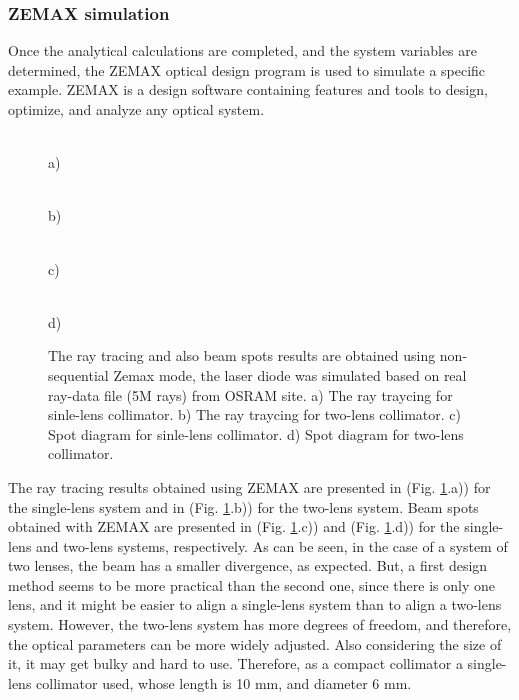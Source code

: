 \subsubsection{ZEMAX simulation}

Once the analytical calculations are completed, and the system variables are determined, the ZEMAX optical design program is used to simulate a specific example.
ZEMAX is a design software containing features and tools to design, optimize, and analyze any optical system.



\begin{figure}[H]
\begin{minipage}[h]{0.48\linewidth}
\\ a)
\end{minipage}
\hfill
\begin{minipage}[h]{0.45\linewidth}
\\ b)
\end{minipage}
\vfill
\begin{minipage}[h]{0.495\linewidth}
 \\ c)
\end{minipage}
\hfill
\begin{minipage}[h]{0.495\linewidth}
 \\ d)
\end{minipage}

\caption{The ray tracing and  also beam spots results are obtained using non-sequential Zemax mode, the laser diode was simulated based on real ray-data file (5M rays) from OSRAM site.
a) The ray traycing for sinle-lens collimator.
b) The ray traycing for two-lens collimator.
c) Spot diagram for sinle-lens collimator.
d) Spot diagram for two-lens collimator.
}
\label{fig:spot_simulation}
\end{figure}





The ray tracing results obtained using ZEMAX are presented in (Fig. \ref{fig:spot_simulation}.a)) for the single-lens system and in (Fig. \ref{fig:spot_simulation}.b)) for the two-lens system.
Beam spots obtained with ZEMAX are presented in (Fig. \ref{fig:spot_simulation}.c)) and (Fig. \ref{fig:spot_simulation}.d)) for the single-lens and two-lens systems, respectively. 
As can be seen, in the case of a system of two lenses, the beam has a smaller divergence, as expected.
But, a first design method seems to be more practical than the second one, since there is only
one lens, and it might be easier to align a single-lens system than to align a two-lens system.
However, the two-lens system has more degrees of freedom, and therefore, the optical
parameters can be more widely adjusted.
Also considering the size of it, it may get bulky and hard to use.
Therefore, as a compact collimator a single-lens collimator used, whose length is 10 mm, and diameter 6 mm.



